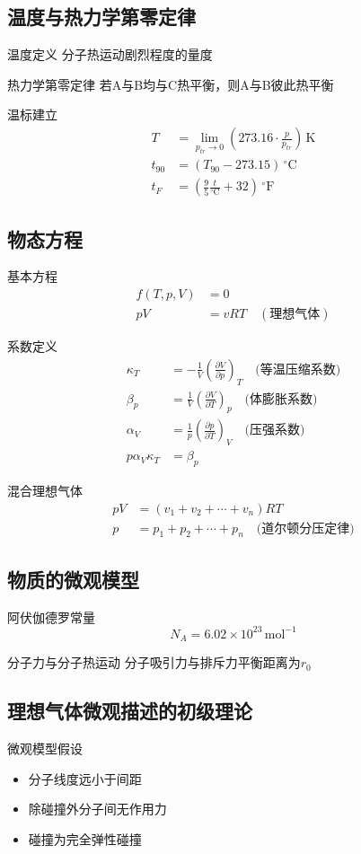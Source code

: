 \documentclass[12pt]{article}
\begin{document}
\subsection{温度与热力学第零定律}
温度定义
分子热运动剧烈程度的量度

热力学第零定律
若A与B均与C热平衡，则A与B彼此热平衡

温标建立
\begin{align*}
    T &= \lim_{p_{tr} \to 0} \left(273.16 \cdot \frac{p}{p_{tr}}\right) \, \text{K} \\
    t_{90} &= \left(T_{90} - 273.15\right) \, ^\circ\text{C} \\
    t_F &= \left(\frac{9}{5} \frac{t}{^\circ\text{C}} + 32\right) \, ^\circ\text{F}
\end{align*}

\subsection{物态方程}
基本方程
\begin{align*}
    f(T, p, V) &= 0 \\
    pV &= vRT \quad (\text{理想气体})
\end{align*}

系数定义
\begin{align*}
    \kappa_T &= -\frac{1}{V} \left(\frac{\partial V}{\partial p}\right)_T \quad \text{(等温压缩系数)} \\
    \beta_p &= \frac{1}{V} \left(\frac{\partial V}{\partial T}\right)_p \quad \text{(体膨胀系数)} \\
    \alpha_V &= \frac{1}{p} \left(\frac{\partial p}{\partial T}\right)_V \quad \text{(压强系数)} \\
    p\alpha_V\kappa_T &= \beta_p
\end{align*}

混合理想气体
\begin{align*}
    pV &= (v_1 + v_2 + \cdots + v_n)RT \\
    p &= p_1 + p_2 + \cdots + p_n \quad \text{(道尔顿分压定律)}
\end{align*}

\subsection{物质的微观模型}
阿伏伽德罗常量
\[
N_A = 6.02 \times 10^{23} \, \text{mol}^{-1}
\]

分子力与分子热运动
分子吸引力与排斥力平衡距离为$r_0$

\subsection{理想气体微观描述的初级理论}
微观模型假设
\begin{itemize}
    \item 分子线度远小于间距
    \item 除碰撞外分子间无作用力  
    \item 碰撞为完全弹性碰撞
\end{itemize}
\end{document}

